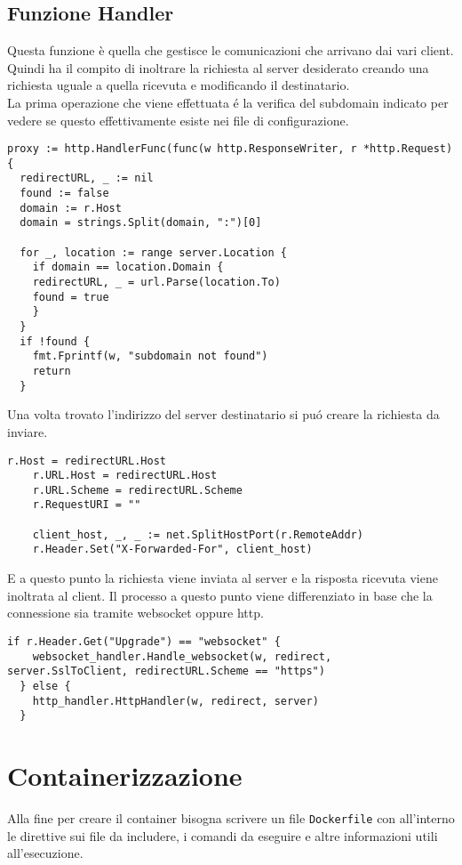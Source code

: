 \subsection{Funzione Handler}
Questa funzione è quella che gestisce le comunicazioni che arrivano dai vari client. Quindi ha il compito di inoltrare la richiesta al server desiderato creando una richiesta uguale a quella ricevuta e modificando il destinatario.\\La prima operazione che viene effettuata é la verifica del subdomain indicato per vedere se questo effettivamente esiste nei file di configurazione.
\begin{lstlisting}[language=Golang]
proxy := http.HandlerFunc(func(w http.ResponseWriter, r *http.Request) {
  redirectURL, _ := nil
  found := false
  domain := r.Host
  domain = strings.Split(domain, ":")[0]

  for _, location := range server.Location {
	if domain == location.Domain {
  	redirectURL, _ = url.Parse(location.To)
  	found = true
	}
  }
  if !found {
	fmt.Fprintf(w, "subdomain not found")
	return
  }
\end{lstlisting}

Una volta trovato l'indirizzo del server destinatario si puó creare la richiesta da inviare.
\begin{lstlisting}[language=Golang]
	r.Host = redirectURL.Host
	r.URL.Host = redirectURL.Host
	r.URL.Scheme = redirectURL.Scheme
	r.RequestURI = ""

	client_host, _, _ := net.SplitHostPort(r.RemoteAddr)
	r.Header.Set("X-Forwarded-For", client_host)
\end{lstlisting}
E a questo punto la richiesta viene inviata al server e la risposta ricevuta viene inoltrata al client. Il processo a questo punto viene differenziato in base che la connessione sia tramite websocket oppure http.
\begin{lstlisting}[language=Golang]
  if r.Header.Get("Upgrade") == "websocket" {
	websocket_handler.Handle_websocket(w, redirect, server.SslToClient, redirectURL.Scheme == "https")
  } else {
	http_handler.HttpHandler(w, redirect, server)
  }
\end{lstlisting}


\section{Containerizzazione}
Alla fine per creare il container bisogna scrivere un file \texttt{Dockerfile} con all'interno le direttive sui file da includere, i comandi da eseguire e altre informazioni utili all'esecuzione.
